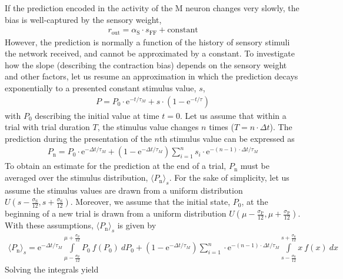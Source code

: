 \documentclass[10pt,a4paper,draft]{article}
\begin{document}
If the prediction encoded in the activity of the M neuron changes very slowly, the bias is well-captured by the sensory weight, 
%
 \begin{align}
 r_\mathrm{out} = \alpha_\mathrm{S} \cdot s_\mathrm{FF} + \mathrm{constant}
 \end{align}
%
However, the prediction is normally a function of the history of sensory stimuli the network received, and cannot be approximated by a constant. To investigate how the slope (describing the contraction bias) depends on the sensory weight and other factors, let us resume an approximation in which the prediction decays exponentially to a presented constant stimulus value, $s$,
%
\begin{align}
P = P_\mathrm{0} \cdot \mathrm{e}^{-t/\tau_M} +  s \cdot \left( 1 -   \mathrm{e}^{-t/\tau} \right)
\end{align}
%
with $P_0$ describing the initial value at time $t=0$. Let us assume that within a trial with trial duration $T$, the stimulus value changes $n$ times ($T = n\cdot \Delta t$).  The prediction during the presentation of the $n$th stimulus value can be expressed as
%
\begin{align}
P_\mathrm{n} = P_\mathrm{0} \cdot \mathrm{e}^{-\Delta t/\tau_M}  + \left( 1 -   \mathrm{e}^{-\Delta t/\tau_M} \right) \sum_{i=1}^{n} s_i \cdot \mathrm{e}^{-(n-1)\cdot \Delta t/ \tau_M}
\end{align}
%
To obtain an estimate for the prediction at the end of a trial, $P_\mathrm{n}$ must be averaged over the stimulus distribution, $\langle P_\mathrm{n} \rangle_s$. For the sake of simplicity, let us assume the stimulus values are drawn from a uniform distribution $U\left( s - \frac{\sigma_\mathrm{S}}{12}, s + \frac{\sigma_\mathrm{S}}{12} \right)$. Moreover, we assume that the initial state, $P_0$, at the beginning of a new trial is drawn from a uniform distribution $U\left( \mu - \frac{\sigma_\mathrm{P}}{12}, \mu + \frac{\sigma_\mathrm{P}}{12} \right)$. With these assumptions, $\langle P_\mathrm{n} \rangle_s$ is given by
%
\begin{align}
\langle P_\mathrm{n} \rangle_s = \mathrm{e}^{-\Delta t/\tau_M}  \int\limits_{\mu - \frac{\sigma_\mathrm{P}}{12}}^{\mu + \frac{\sigma_\mathrm{P}}{12}} P_\mathrm{0} \ f(P_\mathrm{0})\ dP_0+ \left( 1 -   \mathrm{e}^{-\Delta t/\tau_M} \right) \sum_{i=1}^{n} \cdot \mathrm{e}^{-(n-1)\cdot \Delta t/ \tau_M} \int\limits_{s - \frac{\sigma_\mathrm{S}}{12}}^{s + \frac{\sigma_\mathrm{S}}{12}} x\ f(x)\ dx
\end{align}
%
Solving the integrals yield
\end{document}
